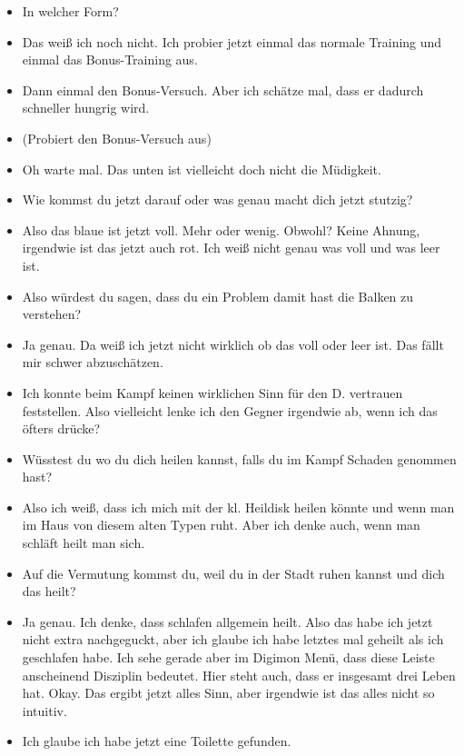{\begin{itemize}[]
    \item {} In welcher Form?
    \item {} Das weiß ich noch nicht. Ich probier jetzt einmal das normale Training und einmal das Bonus-Training aus. 
    \item {} Dann einmal den Bonus-Versuch. Aber ich schätze mal, dass er dadurch schneller hungrig wird.
    \item {} (Probiert den Bonus-Versuch aus)
    \item {} Oh warte mal. Das unten ist vielleicht doch nicht die Müdigkeit.
    \item {} Wie kommst du jetzt darauf oder was genau macht dich jetzt stutzig?
    \item {} Also das blaue ist jetzt voll. Mehr oder wenig. Obwohl? Keine Ahnung, irgendwie ist das jetzt auch rot. Ich weiß nicht genau was voll und was leer ist. 
    \item {} Also würdest du sagen, dass du ein Problem damit hast die Balken zu verstehen?
    \item {} Ja genau. Da weiß ich jetzt nicht wirklich ob das voll oder leer ist. Das fällt mir schwer abzuschätzen. 
    \item {} Ich konnte beim Kampf keinen wirklichen Sinn für den \frq  D. vertrauen\flq{} feststellen. Also vielleicht lenke ich den Gegner irgendwie ab, wenn ich das öfters drücke?
    \item {} Wüsstest du wo du dich heilen kannst, falls du im Kampf Schaden genommen hast?
    \item {} Also ich weiß, dass ich mich mit der \frq  kl. Heildisk\flq{} heilen könnte und wenn man im Haus von diesem alten Typen ruht. Aber ich denke auch, wenn man schläft heilt man sich.
    \item {} Auf die Vermutung kommst du, weil du in der Stadt ruhen kannst und dich das heilt?
    \item {} Ja genau. Ich denke, dass schlafen allgemein heilt. Also das habe ich jetzt nicht extra nachgeguckt, aber ich glaube ich habe letztes mal geheilt als ich geschlafen habe. Ich sehe gerade aber im Digimon Menü, dass diese Leiste anscheinend Disziplin bedeutet. Hier steht auch, dass er insgesamt drei Leben hat. Okay. Das ergibt jetzt alles Sinn, aber irgendwie ist das alles nicht so intuitiv.
    \item {} Ich glaube ich habe jetzt eine Toilette gefunden.

\end{itemize}}
